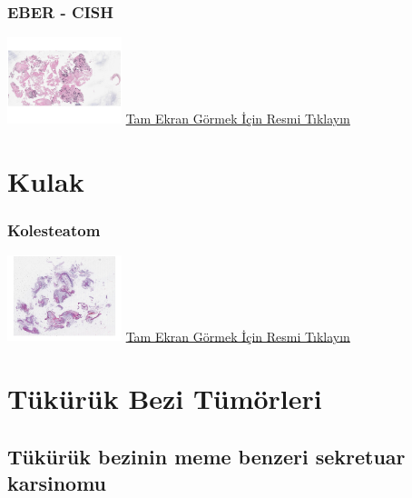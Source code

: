 \documentclass[
  letterpaper,
  DIV=11,
  numbers=noendperiod]{scrreprt}
\begin{document}
\hypertarget{eber---cish}{%
\subsection{EBER - CISH}\label{eber---cish}}

\href{https://images.patolojiatlasi.com/nasopharynx-nonkeratinizing-scc/EBER.html}{\includegraphics[width=0.25\textwidth,height=\textheight]{./screenshots/thumbnail_nasopharynx-nonkeratinizing-scc-EBER.png}}
\href{https://images.patolojiatlasi.com/nasopharynx-nonkeratinizing-scc/EBER.html}{Tam
Ekran Görmek İçin Resmi Tıklayın}

\hypertarget{sec-kulak}{%
\chapter{Kulak}\label{sec-kulak}}

\hypertarget{sec-kolesteatom}{%
\subsection{Kolesteatom}\label{sec-kolesteatom}}

\href{https://images.patolojiatlasi.com/cholesteatoma/HE.html}{\includegraphics[width=0.25\textwidth,height=\textheight]{./screenshots/thumbnail_cholesteatoma.png}}
\href{https://images.patolojiatlasi.com/cholesteatoma/cholesteatoma.html}{Tam
Ekran Görmek İçin Resmi Tıklayın}

\hypertarget{sec-tukuruk-bezi-tumorleri}{%
\chapter{Tükürük Bezi Tümörleri}\label{sec-tukuruk-bezi-tumorleri}}

\hypertarget{tuxfckuxfcruxfck-bezinin-meme-benzeri-sekretuar-karsinomu}{%
\section{Tükürük bezinin meme benzeri sekretuar
karsinomu}\label{tuxfckuxfcruxfck-bezinin-meme-benzeri-sekretuar-karsinomu}}
\end{document}
